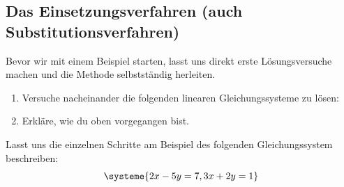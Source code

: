 \documentclass[11pt,oneside]{article}
\begin{document}
\subsection{Das Einsetzungsverfahren (auch Substitutionsverfahren)}
	Bevor wir mit einem Beispiel starten, lasst uns direkt erste Lösungsversuche machen und die Methode selbstständig herleiten.
	\begin{aufgabe}
		\begin{enumerate}
			\item Versuche nacheinander die folgenden linearen Gleichungssysteme zu lösen:
		\end{enumerate}
		\begin{enumerate}
			\setcounter{enumi}{1}
			\item Erkläre, wie du oben vorgegangen bist.
		\end{enumerate}
	\end{aufgabe}
	\begin{algo}[Einsetzungsverfahren)]
		Lasst uns die einzelnen Schritte am Beispiel des folgenden Gleichungssystem beschreiben:
		\[\systeme{2x-5y=7,3x+2y=1}\]
	\end{algo}
\end{document}
